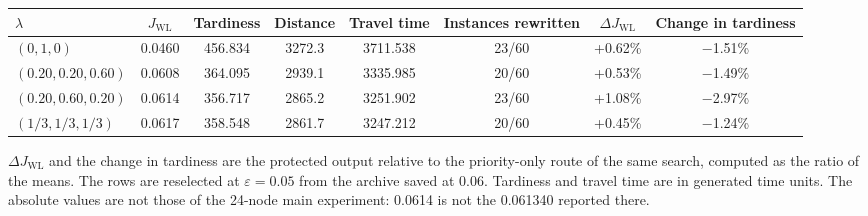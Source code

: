 \documentclass[11pt,a4paper]{article}
\begin{document}
\begin{center}
\scriptsize
\setlength{\tabcolsep}{4pt}
\begin{tabular}{lccccccc}
\toprule
$\lambda$ & $J_{\mathrm{WL}}$ & Tardiness & Distance & Travel time & Instances rewritten & $\Delta J_{\mathrm{WL}}$ & Change in tardiness \\
\midrule
$(0,1,0)$ & 0.0460 & 456.834 & 3272.3 & 3711.538 & 23/60 & +0.62\% & $-$1.51\% \\
$(0.20,0.20,0.60)$ & 0.0608 & 364.095 & 2939.1 & 3335.985 & 20/60 & +0.53\% & $-$1.49\% \\
$(0.20,0.60,0.20)$ & 0.0614 & 356.717 & 2865.2 & 3251.902 & 23/60 & +1.08\% & $-$2.97\% \\
$(1/3,1/3,1/3)$ & 0.0617 & 358.548 & 2861.7 & 3247.212 & 20/60 & +0.45\% & $-$1.24\% \\
\bottomrule
\end{tabular}
\end{center}

$\Delta J_{\mathrm{WL}}$ and the change in tardiness are the protected output relative to the priority-only route of the same search, computed as the ratio of the means. The rows are reselected at $\varepsilon=0.05$ from the archive saved at 0.06. Tardiness and travel time are in generated time units. The absolute values are not those of the 24-node main experiment: 0.0614 is not the 0.061340 reported there.
\end{document}

